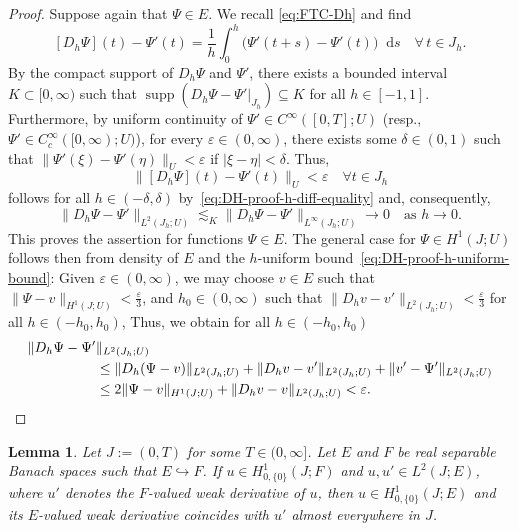 \documentclass[reqno]{amsart}
\numberwithin{equation}{section}
\newcommand{\norm}[2]{     \| #1       \|_{ #2 }}
\newcommand{\rd}{\mathop{}\!\mathrm{d}}
\newtheorem{lemma}{Lemma}[section]
\theoremstyle{remark}
\theoremstyle{definition}
\begin{document}
\begin{proof}
	Suppose again that 
	$\Psi\in E$. 
	We recall \eqref{eq:FTC-Dh} and find  
	\begin{equation}\label{eq:DH-proof-h-diff-equality}  
	[D_h \Psi](t) - \Psi'(t) 
	= 
	\frac{1}{h}\int_0^h 
	\bigl( \Psi'(t+s) - \Psi'(t) \bigr)\rd s 
	\quad 
	\forall \,
	t \in J_h.
	\end{equation}
	By the compact support  
	of $D_h \Psi$ and $\Psi'$, 
	there exists a bounded interval 
	$K \subset [0,\infty)$ 
	such that 
	$\operatorname{supp}(D_h \Psi - \Psi'|_{J_h}) \subseteq K$ 
	for all $h\in[-1,1]$. 
	Furthermore, 
	by uniform continuity of 
	$\Psi' \in C^\infty([0,T];U)$ 
	(resp., $\Psi' \in C_c^\infty([0,\infty);U)$), 
	for every $\varepsilon\in(0,\infty)$, 
	there exists 
	some $\delta\in(0,1)$ such that 
	$\norm{ \Psi'(\xi) - \Psi'(\eta)}{U} < \varepsilon$ 
	if $|\xi-\eta|<\delta$. 
	Thus, 
	\[ 
	\norm{[D_h \Psi](t) - \Psi'(t)}{U} 
	< 
	\varepsilon 
	\quad 
	\forall t \in J_h
	\] 
	follows 
	for all $h\in(-\delta,\delta)$ 
	by~\eqref{eq:DH-proof-h-diff-equality}
	and, consequently,
	\[ 
	\norm{D_h \Psi - \Psi'}{L^2(J_h;U)} 
	\lesssim_{K} 
	\norm{D_h \Psi - \Psi'}{L^\infty(J_h;U)} 
	\to 0 
	\quad \text{as $h \to 0$}.
	\] 
	This proves the assertion  
	for functions $\Psi\in E$. 
	The general case for $\Psi\in H^1(J;U)$ 
	follows then from density of $E$ and the $h$-uniform 
	bound~\eqref{eq:DH-proof-h-uniform-bound}:  
	Given $\varepsilon\in(0,\infty)$, 
	we may choose $v \in E$ 
	such that ${\norm{\Psi-v}{H^1(J;U)} < \frac{\varepsilon}{3}}$, 
	and $h_0 \in(0,\infty)$ such that 
	$\norm{D_h v - v'}{L^2(J_h;U)}<\frac{\varepsilon}{3}$ 
	for all $h\in(-h_0, h_0)$, 
	Thus, we obtain for all $h\in(-h_0, h_0)$ 
	\begin{align*}
	\| D_h  \Psi - \Psi' &\|_{L^2(J_h;U)} 
	\\
	&\leq 
	\norm{D_h (\Psi - v)}{L^2(J_h;U)}
	+ 
	\norm{D_h v - v'}{L^2(J_h;U)}
	+ 
	\norm{ v' - \Psi'}{L^2(J_h;U)} 
	\\
	&\leq 
	2\norm{\Psi - v}{H^1(J;U)} 
	+ 
	\norm{D_h v - v}{L^2(J_h;U)} 
	< \varepsilon . 
	\qedhere 
	\end{align*}
\end{proof}

\begin{lemma}\label{lem:embedding-weak-derivs}
	Let $J := (0,T)$ for some $T \in (0,\infty]$. 
	Let $E$ and $F$ be real separable Banach spaces 
	such that
	$E \hookrightarrow F$. 
	If $u \in H^1_{ 0,\{0\} }(J; F)$ and
	$u, u'\in L^2(J; E)$, where $u'$ denotes the
	$F$-valued weak derivative of $u$,
	then $u \in H^1_{ 0,\{0\} }(J; E)$ 
	and its $E$-valued weak derivative
	coincides with $u'$ 
	almost everywhere in $J$. 
\end{lemma}
\end{document}
